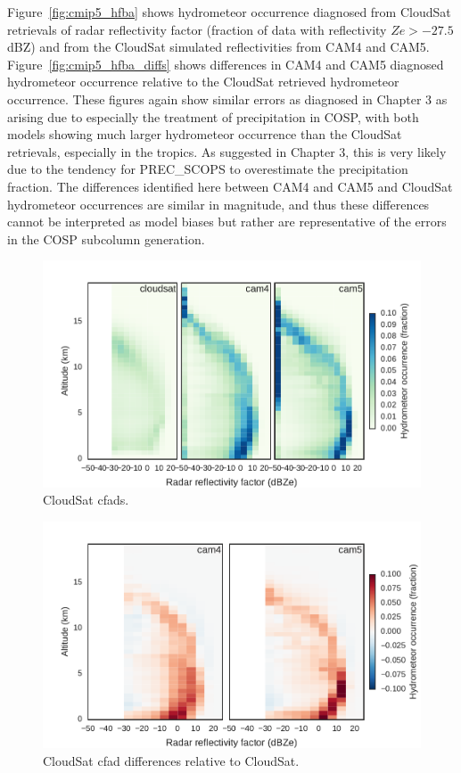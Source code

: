 Figure~\ref{fig:cmip5_hfba} shows hydrometeor occurrence diagnosed from
CloudSat retrievals of radar reflectivity factor (fraction of data with
reflectivity \(Ze > -27.5\) dBZ) and from the CloudSat simulated
reflectivities from CAM4 and CAM5. Figure~\ref{fig:cmip5_hfba_diffs}
shows differences in CAM4 and CAM5 diagnosed hydrometeor occurrence
relative to the CloudSat retrieved hydrometeor occurrence. These figures
again show similar errors as diagnosed in Chapter 3 as arising due to
especially the treatment of precipitation in COSP, with both models
showing much larger hydrometeor occurrence than the CloudSat retrievals,
especially in the tropics. As suggested in Chapter 3, this is very
likely due to the tendency for PREC\_SCOPS to overestimate the
precipitation fraction. The differences identified here between CAM4 and
CAM5 and CloudSat hydrometeor occurrences are similar in magnitude, and
thus these differences cannot be interpreted as model biases but rather
are representative of the errors in the COSP subcolumn generation.

\begin{figure}[htbp]
\centering
\includegraphics{graphics/cmip5_cfadDbze94_NHTropics.pdf}
\caption{\label{fig:cmip5_cfads}CloudSat
cfads.}\label{fig:cmip5ux5fcfads}
\end{figure}

\begin{figure}[htbp]
\centering
\includegraphics{graphics/cmip5_cfadDbze94_NHTropics_diff.pdf}
\caption{\label{fig:cmip5_cfads_diffs}CloudSat cfad differences relative
to CloudSat.}\label{fig:cmip5ux5fcfadsux5fdiffs}
\end{figure}

